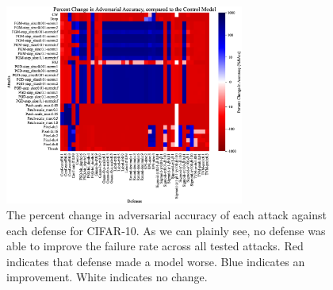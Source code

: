 \documentclass[journal]{IEEEtran}
\begin{document}
\begin{figure}[!ht]
    {\centering
    \includegraphics[trim={0 0.85em 0 0.4em},clip,width=0.7\textwidth]{Fig11.eps}
    \caption{The percent change in adversarial accuracy of each attack against each defense for CIFAR-10. As we can plainly see, no defense was able to improve the failure rate across all tested attacks. Red indicates that defense made a model worse. Blue indicates an improvement. White indicates no change.}
    \label{fig:adv_acc_grid}
    } %
\end{figure}
\end{document}
